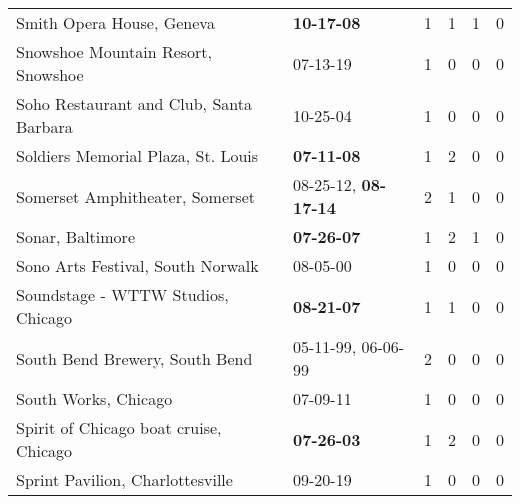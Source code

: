 \begin{longtable}{p{}p{}p{}p{}p{}p{}}
                                                    Smith Opera House, Geneva &                                       \textbf{10-17-08\textsuperscript{}} &  1 &  1 &  1 &  0 \\
                                           Snowshoe Mountain Resort, Snowshoe &                                                07-13-19\textsuperscript{} &  1 &  0 &  0 &  0 \\
                                      Soho Restaurant and Club, Santa Barbara &                                                10-25-04\textsuperscript{} &  1 &  0 &  0 &  0 \\
                                           Soldiers Memorial Plaza, St. Louis &                                       \textbf{07-11-08\textsuperscript{}} &  1 &  2 &  0 &  0 \\
                                              Somerset Amphitheater, Somerset &           08-25-12\textsuperscript{}, \textbf{08-17-14\textsuperscript{}} &  2 &  1 &  0 &  0 \\
                                                             Sonar, Baltimore &                                       \textbf{07-26-07\textsuperscript{}} &  1 &  2 &  1 &  0 \\
                                            Sono Arts Festival, South Norwalk &                                                08-05-00\textsuperscript{} &  1 &  0 &  0 &  0 \\
                                           Soundstage - WTTW Studios, Chicago &                                       \textbf{08-21-07\textsuperscript{}} &  1 &  1 &  0 &  0 \\
                                               South Bend Brewery, South Bend &                    05-11-99\textsuperscript{}, 06-06-99\textsuperscript{} &  2 &  0 &  0 &  0 \\
                                                         South Works, Chicago &                                                07-09-11\textsuperscript{} &  1 &  0 &  0 &  0 \\
                                       Spirit of Chicago boat cruise, Chicago &                                       \textbf{07-26-03\textsuperscript{}} &  1 &  2 &  0 &  0 \\
                                             Sprint Pavilion, Charlottesville &                                                09-20-19\textsuperscript{} &  1 &  0 &  0 &  0 \\

\end{longtable}
